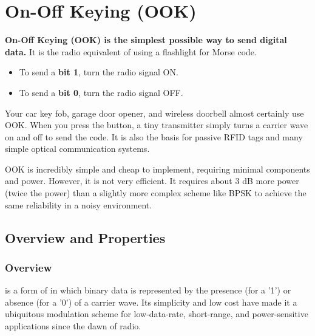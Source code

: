 
\chapter{On-Off Keying (OOK)}
\label{ch:ook}

\begin{nontechnical}
    \textbf{On-Off Keying (OOK) is the simplest possible way to send digital data.} It is the radio equivalent of using a flashlight for Morse code.

    \begin{itemize}
        \item To send a \textbf{bit 1}, turn the radio signal ON.
        \item To send a \textbf{bit 0}, turn the radio signal OFF.
    \end{itemize}

     Your car key fob, garage door opener, and wireless doorbell almost certainly use OOK. When you press the button, a tiny transmitter simply turns a carrier wave on and off to send the code. It is also the basis for passive RFID tags and many simple optical communication systems.

     OOK is incredibly simple and cheap to implement, requiring minimal components and power. However, it is not very efficient. It requires about 3 dB more power (twice the power) than a slightly more complex scheme like BPSK to achieve the same reliability in a noisy environment.
\end{nontechnical}


\section{Overview and Properties}

\subsection{Overview}

 is a form of  in which binary data is represented by the presence (for a '1') or absence (for a '0') of a carrier wave. Its simplicity and low cost have made it a ubiquitous modulation scheme for low-data-rate, short-range, and power-sensitive applications since the dawn of radio.

